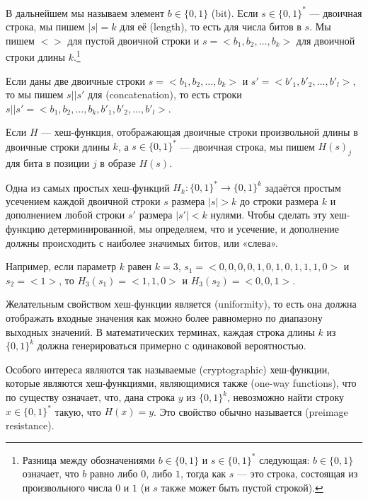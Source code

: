 \begin{notation}
\label{string_and_hash_notations}
В дальнейшем мы называем элемент $b\in\{0,1\}$  (bit). Если $s\in\{0,1\}^*$ — двоичная строка, мы пишем $|s|=k$ для её  (length), то есть для числа битов в $s$. Мы пишем $<>$ для пустой двоичной строки и $s=<b_1,b_2,\ldots,b_k>$ для двоичной строки длины $k$.\footnote{Разница между обозначениями $b\in\{0,1\}$ и $s\in\{0,1\}^*$ следующая: $b\in\{0,1\}$ означает, что $b$ равно либо $0$, либо $1$, тогда как $s$ — это строка, состоящая из произвольного числа $0$ и $1$ (и $s$ также может быть пустой строкой).}

Если даны две двоичные строки $s=<b_1,b_2,\ldots,b_k>$ и $s'=<b'_1,b'_2,\ldots,b'_l>$, то мы пишем $s||s'$ для  (concatenation), то есть строки 
$s||s'=<b_1,b_2,\ldots,b_k,b'_1,b'_2,\ldots,b'_l>$.

Если $H$ — хеш-функция, отображающая двоичные строки произвольной длины в двоичные строки длины $k$, а $s\in\{0,1\}^*$ — двоичная строка, мы пишем $H(s)_j$ для бита в позиции $j$ в образе $H(s)$.
\end{notation}

\begin{example}\label{ex:k-truncation-hash} Одна из самых простых хеш-функций $H_k:\{0,1\}^*\to \{0,1\}^k$ задаётся простым усечением каждой двоичной строки $s$ размера $|s|> k$ до строки размера $k$ и дополнением любой строки $s'$ размера $|s'|<k$ нулями. Чтобы сделать эту хеш-функцию детерминированной, мы определяем, что и усечение, и дополнение должны происходить с наиболее значимых битов, или «слева».

Например, если параметр $k$ равен $k=3$, $s_1=<0,0,0,0,1,0,1,0,1,1,1,0>$ и $s_2=<1>$, то $H_3(s_1)=<1,1,0>$ и $H_3(s_2)=<0,0,1>$.
\end{example}

Желательным свойством хеш-функции является  (uniformity), то есть она должна отображать входные значения как можно более равномерно по диапазону выходных значений. В математических терминах, каждая строка длины $k$ из $\{0,1\}^k$ должна генерироваться примерно с одинаковой вероятностью.

Особого интереса являются так называемые  (cryptographic) хеш-функции, которые являются хеш-функциями, являющимися также  (one-way functions), что по существу означает, что, дана строка $y$ из $\{0,1\}^k$, невозможно найти строку $x\in\{0,1\}^*$ такую, что $H(x)=y$. Это свойство обычно называется  (preimage resistance).

